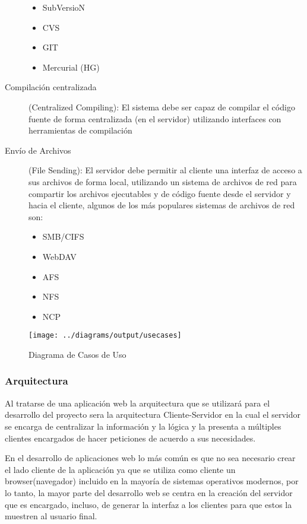 \begin{description}
	\begin{itemize}
		\item SubVersioN
		\item CVS
		\item GIT
		\item Mercurial (HG)
	\end{itemize}
	
	\item [Compilación centralizada] (Centralized Compiling): \newline
	El sistema debe ser capaz de compilar el código fuente de forma centralizada (en el servidor) utilizando interfaces con herramientas de compilación
	
	\item [Envío de Archivos] (File Sending): \newline
	El servidor debe permitir al cliente una interfaz de acceso a sus archivos de forma local, utilizando un sistema de archivos de red para compartir los archivos ejecutables y de código fuente desde el servidor y hacia el cliente, algunos de los más populares sistemas de archivos de red son:
	
	\begin{itemize}
		\item SMB/CIFS
		\item WebDAV
		\item AFS
		\item NFS
		\item NCP
	\end{itemize}
	
\end{description}

\begin{figure}
 \centering
 \texttt{[image: ../diagrams/output/usecases]}
 \caption{Diagrama de Casos de Uso}
 \label{diagrama:casos_uso}
\end{figure}


\subsubsection{Arquitectura}

Al tratarse de una aplicación web la arquitectura que se utilizará para el desarrollo del proyecto sera la arquitectura Cliente-Servidor en la cual el servidor se encarga de centralizar la información y la lógica y la presenta a múltiples clientes encargados de hacer peticiones de acuerdo a sus necesidades.

En el desarrollo de aplicaciones web lo más común es que no sea necesario crear el lado cliente de la aplicación ya que se utiliza como cliente un browser(navegador) incluido en la mayoría de sistemas operativos modernos, por lo tanto, la mayor parte del desarrollo web se centra en la creación del servidor que es encargado, incluso, de generar la interfaz a los clientes para que estos la muestren al usuario final.


